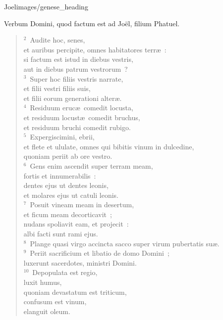 {Joel}{images/genese_heading}


\lettrine[lines=10,image=true,loversize=0.05,lraise=-0.03]{V}{}erbum Domini, quod factum est ad Jo\"el, filium Phatuel.
\begin{flushleft}\begin{verse}\vspace{6pt}${}^{2}$~Audite hoc, senes,\\ et auribus percipite, omnes habitatores terr\ae~:\\ si factum est istud in diebus vestris,\\ aut in diebus patrum vestrorum~?\\
${}^{3}$~Super hoc filiis vestris narrate,\\ et filii vestri filiis suis,\\ et filii eorum generationi alter\ae .\\
${}^{4}$~Residuum eruc\ae\ comedit locusta,\\ et residuum locust\ae\ comedit bruchus,\\ et residuum bruchi comedit rubigo.\\
${}^{5}$~Expergiscimini, ebrii,\\ et flete et ululate, omnes qui bibitis vinum in dulcedine,\\ quoniam periit ab ore vestro.\\
${}^{6}$~Gens enim ascendit super terram meam,\\ fortis et innumerabilis~:\\ dentes ejus ut dentes leonis,\\ et molares ejus ut catuli leonis.\\
${}^{7}$~Posuit vineam meam in desertum,\\ et ficum meam decorticavit~;\\ nudans spoliavit eam, et projecit~:\\ albi facti sunt rami ejus.\\
${}^{8}$~Plange quasi virgo accincta sacco super virum pubertatis su\ae .\\
${}^{9}$~Periit sacrificium et libatio de domo Domini~;\\ luxerunt sacerdotes, ministri Domini.\\
${}^{10}$~Depopulata est regio,\\ luxit humus,\\ quoniam devastatum est triticum,\\ confusum est vinum,\\ elanguit oleum.\\

\end{verse}
\end{flushleft}
